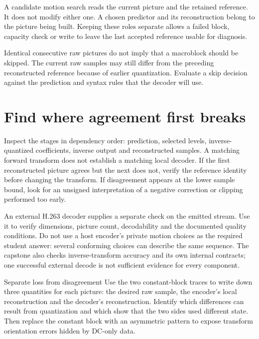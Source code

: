 A candidate motion search reads the current picture and the retained reference.
It does not modify either one. A chosen predictor and its reconstruction belong
to the picture being built. Keeping these roles separate allows a failed block,
capacity check or write to leave the last accepted reference usable for diagnosis.

Identical consecutive raw pictures do not imply that a macroblock should be
skipped. The current raw samples may still differ from the preceding reconstructed
reference because of earlier quantization. Evaluate a skip decision against the
prediction and syntax rules that the decoder will use.

\section{Find where agreement first breaks}

Inspect the stages in dependency order: prediction, selected levels,
inverse-quantized coefficients, inverse output and reconstructed samples. A matching
forward transform does not establish a matching local decoder. If the first
reconstructed picture agrees but the next does not, verify the reference identity
before changing the transform. If disagreement appears at the lower sample bound,
look for an unsigned interpretation of a negative correction or clipping performed
too early.

An external H.263 decoder supplies a separate check on the emitted stream.
Use it to verify dimensions, picture count, decodability and the documented quality
conditions. Do not use a host encoder's private motion choices as the required
student answer: several conforming choices can describe the same sequence.
The capstone also checks inverse-transform accuracy and its own internal contracts;
one successful external decode is not sufficient evidence for every component.

\begin{MARSExercise}{Separate loss from disagreement}
  Use the two constant-block traces to write down three quantities for each picture:
  the desired raw sample, the encoder's local reconstruction and the decoder's
  reconstruction. Identify which differences can result from quantization and which
  show that the two sides used different state. Then replace the constant block with
  an asymmetric pattern to expose transform orientation errors hidden by DC-only data.
\end{MARSExercise}

